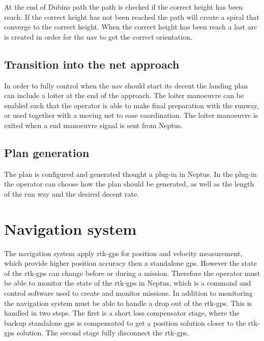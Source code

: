 At the end of Dubins path the path is checked if the correct height has been reach. If the correct height has not been reached the path will create a spiral that converge to the correct height. When the correct height has been reach a last arc is created in order for the \gls{uav} to get the correct orientation.
\subsection{Transition into the net approach}
In order to fully control when the \gls{uav} should start its decent the landing plan can include a loiter at the end of the approach. The loiter manoeuvre can be enabled such that the operator is able to make final preparation with the runway, or used together with a moving net to ease coordination. The loiter manoeuvre is exited when a end manoeuvre signal is sent from Neptus.
\subsection{Plan generation}\label{SS:PlanGeneration}
The plan is configured and generated thought a plug-in in Neptus. In the plug-in the operator can choose how the plan should be generated, as well as the length of the run way and the desired decent rate.
\section{Navigation system}
The navigation system apply \gls{rtk-gps} for position and velocity measurement, which provide higher position accuracy then a standalone \gls{gps}. However the state of the \gls{rtk-gps} can change before or during a mission. Therefore the operator must be able to monitor the state of the \gls{rtk-gps} in Neptus, which is a command and control software used to create and monitor missions. In addition to monitoring the navigation system must be able to handle a drop out of the \gls{rtk-gps}. This is handled in two steps. The first is a short loss compensator stage, where the backup standalone \gls{gps} is compensated to get a position solution closer to the \gls{rtk-gps} solution. The second stage fully disconnect the \gls{rtk-gps}.
